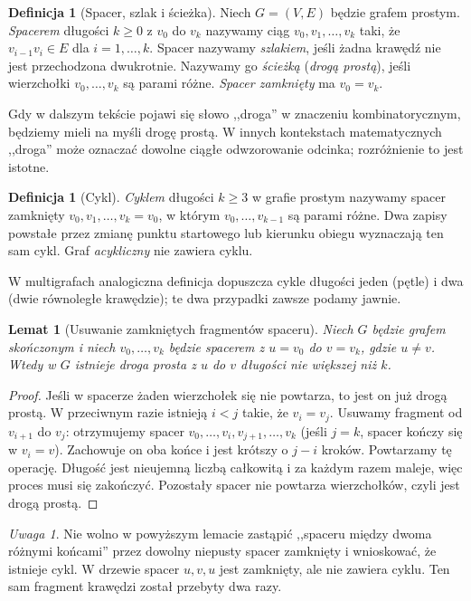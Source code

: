 \documentclass[11pt,a4paper]{report}
\numberwithin{equation}{section}
\theoremstyle{plain}
\newtheorem{lemat}[twierdzenie]{Lemat}
\theoremstyle{definition}
\newtheorem{definicja}[twierdzenie]{Definicja}
\theoremstyle{remark}
\newtheorem{uwaga}[twierdzenie]{Uwaga}
\begin{document}
\begin{definicja}[Spacer, szlak i ścieżka]
Niech $G=(V,E)$ będzie grafem prostym.
\emph{Spacerem} długości $k\ge0$ z $v_0$ do $v_k$
nazywamy ciąg $v_0,v_1,\ldots,v_k$ taki, że
$v_{i-1}v_i\in E$ dla $i=1,\ldots,k$.
Spacer nazywamy \emph{szlakiem}, jeśli żadna
krawędź nie jest przechodzona dwukrotnie.
Nazywamy go \emph{ścieżką} (\emph{drogą prostą}), jeśli
wierzchołki $v_0,\ldots,v_k$ są parami różne.
\emph{Spacer zamknięty} ma $v_0=v_k$.
\end{definicja}

Gdy w dalszym tekście pojawi się słowo ,,droga'' w znaczeniu
kombinatorycznym, będziemy mieli na myśli drogę prostą. W innych kontekstach matematycznych
,,droga'' może oznaczać dowolne ciągłe odwzorowanie odcinka;
rozróżnienie to jest istotne.

\begin{definicja}[Cykl]
\emph{Cyklem} długości $k\ge3$ w grafie prostym
nazywamy spacer zamknięty $v_0,v_1,\ldots,v_k=v_0$,
w którym $v_0,\ldots,v_{k-1}$ są parami różne.
Dwa zapisy powstałe przez zmianę punktu startowego
lub kierunku obiegu wyznaczają ten sam cykl.
Graf \emph{acykliczny} nie zawiera cyklu.
\end{definicja}

W multigrafach analogiczna definicja dopuszcza
cykle długości jeden (pętle) i dwa (dwie równoległe
krawędzie); te dwa przypadki zawsze podamy jawnie.

\begin{lemat}[Usuwanie zamkniętych fragmentów spaceru]
Niech $G$ będzie grafem skończonym i niech
$v_0,\ldots,v_k$ będzie spacerem z $u=v_0$
do $v=v_k$, gdzie $u\ne v$. Wtedy w $G$
istnieje droga prosta z $u$ do $v$ długości
nie większej niż $k$.
\end{lemat}

\begin{proof}
Jeśli w spacerze żaden wierzchołek się nie powtarza,
to jest on już drogą prostą. W przeciwnym razie istnieją
$i<j$ takie, że $v_i=v_j$. Usuwamy fragment od
$v_{i+1}$ do $v_j$: otrzymujemy spacer
$v_0,\ldots,v_i,v_{j+1},\ldots,v_k$
(jeśli $j=k$, spacer kończy się w $v_i=v$).
Zachowuje on oba końce i jest krótszy o $j-i$ kroków.
Powtarzamy tę operację. Długość jest nieujemną liczbą
całkowitą i za każdym razem maleje, więc proces
musi się zakończyć. Pozostały spacer nie powtarza
wierzchołków, czyli jest drogą prostą.
\end{proof}

\begin{uwaga}
Nie wolno w powyższym lemacie zastąpić ,,spaceru między
dwoma różnymi końcami'' przez dowolny niepusty spacer
zamknięty i wnioskować, że istnieje cykl. W drzewie
spacer $u,v,u$ jest zamknięty, ale nie zawiera cyklu.
Ten sam fragment krawędzi został przebyty dwa razy.
\end{uwaga}
\end{document}
